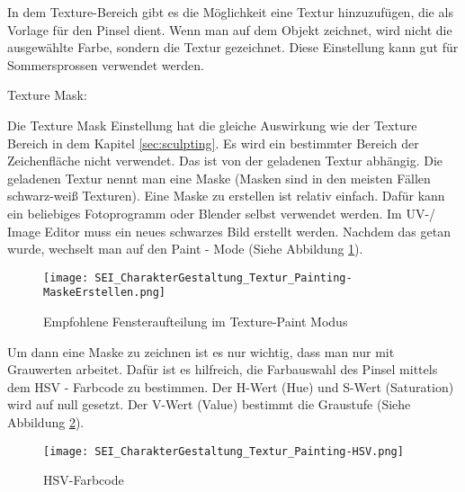     In dem Texture-Bereich gibt es die Möglichkeit eine Textur hinzuzufügen, die als Vorlage für den Pinsel dient.
    Wenn man auf dem Objekt zeichnet, wird nicht die ausgewählte Farbe, sondern die Textur gezeichnet. Diese
    Einstellung kann gut für Sommersprossen verwendet werden.


    Texture Mask:

    Die Texture Mask Einstellung hat die gleiche Auswirkung wie der Texture Bereich in dem Kapitel \ref{sec:sculpting}.
    Es wird ein bestimmter Bereich der Zeichenfläche nicht verwendet. Das ist von der geladenen Textur abhängig.
    Die geladenen Textur nennt man eine Maske (Masken sind in den meisten Fällen schwarz-weiß Texturen).
    Eine Maske zu erstellen ist relativ einfach. Dafür kann ein beliebiges Fotoprogramm oder Blender selbst verwendet
    werden. Im UV-/ Image Editor muss ein neues schwarzes Bild erstellt werden. Nachdem das getan wurde, wechselt man
    auf den Paint - Mode (Siehe Abbildung \ref{picture:paint_mode}).

    \begin{figure}[H]
        \centering
        \texttt{[image: SEI\_CharakterGestaltung\_Textur\_Painting-MaskeErstellen.png]}
        \caption{Empfohlene Fensteraufteilung im Texture-Paint Modus}
        \label{picture:paint_mode}
    \end{figure}

    Um dann eine Maske zu zeichnen ist es nur wichtig, dass man nur mit Grauwerten arbeitet. Dafür ist es hilfreich,
    die Farbauswahl des Pinsel mittels dem HSV - Farbcode zu bestimmen. Der H-Wert (Hue) und S-Wert (Saturation) wird
    auf null gesetzt. Der V-Wert (Value) bestimmt die Graustufe (Siehe Abbildung \ref{picture:hsv_color_code}).

    \begin{figure}[H]
        \centering
        \texttt{[image: SEI\_CharakterGestaltung\_Textur\_Painting-HSV.png]}
        \caption{HSV-Farbcode}
        \label{picture:hsv_color_code}
    \end{figure}
\flushbottom